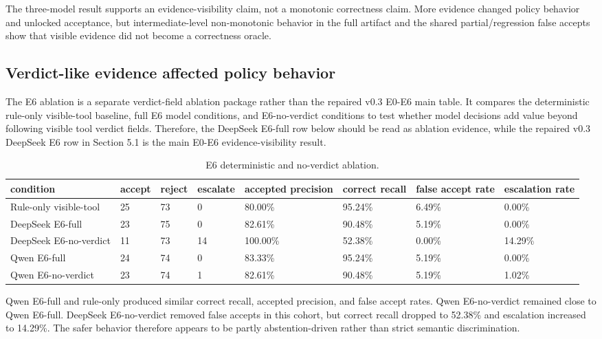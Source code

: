 \documentclass[conference]{IEEEtran}
\begin{document}
The three-model result supports an evidence-visibility claim, not a monotonic correctness claim. More evidence changed policy behavior and unlocked acceptance, but intermediate-level non-monotonic behavior in the full artifact and the shared partial/regression false accepts show that visible evidence did not become a correctness oracle.

\subsection{Verdict-like evidence affected policy behavior}

The E6 ablation is a separate verdict-field ablation package rather than the repaired v0.3 E0-E6 main table. It compares the deterministic rule-only visible-tool baseline, full E6 model conditions, and E6-no-verdict conditions to test whether model decisions add value beyond following visible tool verdict fields. Therefore, the DeepSeek E6-full row below should be read as ablation evidence, while the repaired v0.3 DeepSeek E6 row in Section 5.1 is the main E0-E6 evidence-visibility result.

\begin{table}[t]
\centering
\scriptsize
\setlength{\tabcolsep}{2pt}
\caption{E6 deterministic and no-verdict ablation.}
\label{tab:apsec-4}
\begin{tabularx}{\textwidth}{YYYYYYYY}
\toprule
condition & accept & reject & escalate & accepted precision & correct recall & false accept rate & escalation rate \\
\midrule
Rule-only visible-tool & 25 & 73 & 0 & 80.00\% & 95.24\% & 6.49\% & 0.00\% \\
DeepSeek E6-full & 23 & 75 & 0 & 82.61\% & 90.48\% & 5.19\% & 0.00\% \\
DeepSeek E6-no-verdict & 11 & 73 & 14 & 100.00\% & 52.38\% & 0.00\% & 14.29\% \\
Qwen E6-full & 24 & 74 & 0 & 83.33\% & 95.24\% & 5.19\% & 0.00\% \\
Qwen E6-no-verdict & 23 & 74 & 1 & 82.61\% & 90.48\% & 5.19\% & 1.02\% \\
\bottomrule
\end{tabularx}
\end{table}

Qwen E6-full and rule-only produced similar correct recall, accepted precision, and false accept rates. Qwen E6-no-verdict remained close to Qwen E6-full. DeepSeek E6-no-verdict removed false accepts in this cohort, but correct recall dropped to 52.38\% and escalation increased to 14.29\%. The safer behavior therefore appears to be partly abstention-driven rather than strict semantic discrimination.
\end{document}
